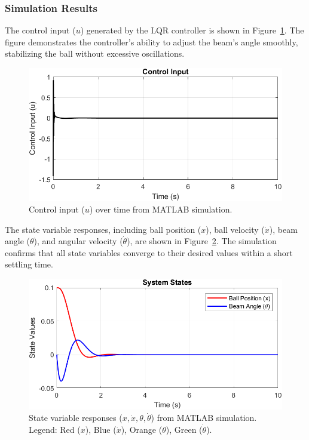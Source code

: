 \documentclass[conference]{IEEEtran}
\begin{document}
\subsubsection{Simulation Results}
The control input (\(u\)) generated by the LQR controller is shown in Figure~\ref{fig:matlab_control}. The figure demonstrates the controller's ability to adjust the beam's angle smoothly, stabilizing the ball without excessive oscillations.

\begin{figure}[htbp]
    \centering
    \includegraphics[width=\linewidth]{figures/control_input_sim.png}
    \caption[]{Control input (\(u\)) over time from MATLAB simulation.}
    \label{fig:matlab_control}
\end{figure}

The state variable responses, including ball position (\(x\)), ball velocity (\(\dot{x}\)), beam angle (\(\theta\)), and angular velocity (\(\dot{\theta}\)), are shown in Figure~\ref{fig:matlab_states}. The simulation confirms that all state variables converge to their desired values within a short settling time.

\begin{figure}[htbp]
    \centering
    \includegraphics[width=\linewidth]{figures/state_sim.png}
    \caption[]{State variable responses (\(x, \dot{x}, \theta, \dot{\theta}\)) from MATLAB simulation. Legend: Red (\(x\)), Blue (\(\dot{x}\)), Orange (\(\theta\)), Green (\(\dot{\theta}\)).}
    \label{fig:matlab_states}
\end{figure}
\end{document}
